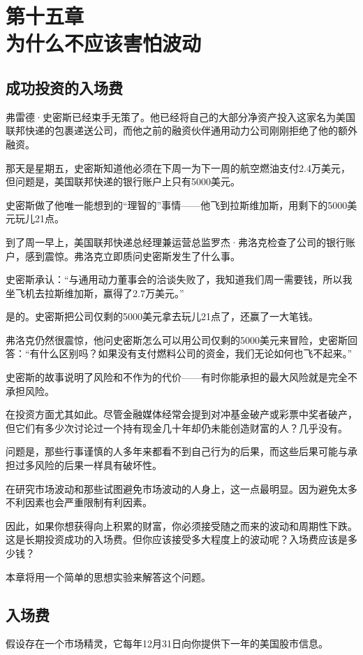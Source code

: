 \section[第十五章\q 为什么不应该害怕波动]{第十五章\\ 为什么不应该害怕波动}
\renewcommand{\bookchapter}{15}
\setcounter{figure}{0}
\setcounter{table}{0}
\subsection{成功投资的入场费}
弗雷德·史密斯已经束手无策了。他已经将自己的大部分净资产投入这家名为美国联邦快递的包裹递送公司，而他之前的融资伙伴通用动力公司刚刚拒绝了他的额外融资。

那天是星期五，史密斯知道他必须在下周一为下一周的航空燃油支付2.4万美元，但问题是，美国联邦快递的银行账户上只有5000美元。

史密斯做了他唯一能想到的“理智的”事情——他飞到拉斯维加斯，用剩下的5000美元玩儿21点。

到了周一早上，美国联邦快递总经理兼运营总监罗杰·弗洛克检查了公司的银行账户，感到震惊。弗洛克立即质问史密斯发生了什么事。

史密斯承认：“与通用动力董事会的洽谈失败了，我知道我们周一需要钱，所以我坐飞机去拉斯维加斯，赢得了2.7万美元。”

是的。史密斯把公司仅剩的5000美元拿去玩儿21点了，还赢了一大笔钱。

弗洛克仍然很震惊，他问史密斯怎么可以用公司仅剩的5000美元来冒险，史密斯回答：“有什么区别吗？如果没有支付燃料公司的资金，我们无论如何也飞不起来。”

史密斯的故事说明了风险和不作为的代价——有时你能承担的最大风险就是完全不承担风险。

在投资方面尤其如此。尽管金融媒体经常会提到对冲基金破产或彩票中奖者破产，但它们有多少次讨论过一个持有现金几十年却仍未能创造财富的人？几乎没有。

问题是，那些行事谨慎的人多年来都看不到自己行为的后果，而这些后果可能与承担过多风险的后果一样具有破坏性。

在研究市场波动和那些试图避免市场波动的人身上，这一点最明显。因为避免太多不利因素也会严重限制有利因素。

因此，如果你想获得向上积累的财富，你必须接受随之而来的波动和周期性下跌。这是长期投资成功的入场费。但你应该接受多大程度上的波动呢？入场费应该是多少钱？

本章将用一个简单的思想实验来解答这个问题。

\subsection{入场费}
假设存在一个市场精灵，它每年12月31日向你提供下一年的美国股市信息。

